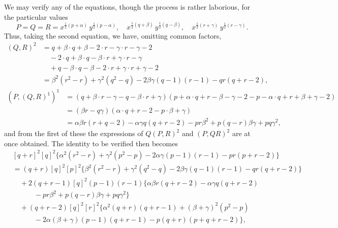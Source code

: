 \documentclass[11pt,a4paper]{article}
\begin{document}
We may verify any of the equations, though the process is rather laborious, for the particular values
\[
P = Q = R = x^{\frac{1}{2}(p+\alpha)}\,y^{\frac{1}{2}(p-\alpha)},\quad x^{\frac{1}{2}(q+\beta)}\,y^{\frac{1}{2}(q-\beta)},\quad x^{\frac{1}{2}(r+\gamma)}\,y^{\frac{1}{2}(r-\gamma)}.
\]
Thus, taking the second equation, we have, omitting common factors,
\begin{align*}
(Q, R)^{2} &= q + \beta\cdot q + \beta - 2\cdot r - \gamma\cdot r - \gamma - 2\\
&\quad - 2\cdot q + \beta\cdot q - \beta\cdot r + \gamma\cdot r - \gamma\\
&\quad + q - \beta\cdot q - \beta - 2\cdot r + \gamma\cdot r + \gamma - 2\\
&= \beta^{2}(r^{2} - r) + \gamma^{2}(q^{2} - q) - 2\beta\gamma(q - 1)(r - 1) - qr(q + r - 2),
\end{align*}
\begin{align*}
(P, (Q, R)^{1})^{1} &= (q + \beta\cdot r - \gamma - q - \beta\cdot r + \gamma)(p + \alpha\cdot q + r - \beta - \gamma - 2 - p - \alpha\cdot q + r + \beta + \gamma - 2)\\
&= (\beta r - q\gamma)(\alpha\cdot q + r - 2 - p\cdot \beta + \gamma)\\
&= \alpha\beta r(r + q - 2) - \alpha\gamma q(q + r - 2) - pr\beta^{2} + p(q - r)\beta\gamma + pq\gamma^{2},
\end{align*}
and from the first of these the expressions of $Q(P, R)^{2}$ and $(P, QR)^{2}$ are at once obtained. The identity to be verified then becomes
\begin{align*}
&[q + r]^{2}[q]^{2}\{\alpha^{2}(r^{2} - r) + \gamma^{2}(p^{2} - p) - 2\alpha\gamma(p - 1)(r - 1) - pr(p + r - 2)\}\\
&= (q + r)[q]^{2}[p]^{2}\{\beta^{2}(r^{2} - r) + \gamma^{2}(q^{2} - q) - 2\beta\gamma(q - 1)(r - 1) - qr(q + r - 2)\}\\
&\quad + 2(q + r - 1)[q]^{2}(p - 1)(r - 1)\{\alpha\beta r(q + r - 2) - \alpha\gamma q(q + r - 2)\\
&\quad\quad\quad - pr\beta^{2} + p(q - r)\beta\gamma + pq\gamma^{2}\}\\
&\quad + (q + r - 2)[q]^{2}[r]^{2}\{\alpha^{2}(q + r)(q + r - 1) + (\beta + \gamma)^{2}(p^{2} - p)\\
&\quad\quad\quad - 2\alpha(\beta + \gamma)(p - 1)(q + r - 1) - p(q + r)(p + q + r - 2)\},
\end{align*}

\newpage

\end{document}
